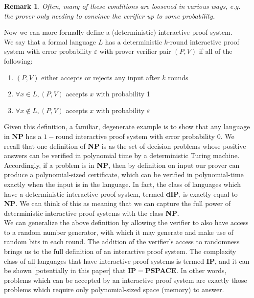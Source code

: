 \documentclass[12pt]{article}
\newtheorem*{rmk}{Remark}
\begin{document}
	\begin{rmk} Often, many of these conditions are loosened in various ways, e.g. the prover only needing to convince the verifier up to some probability.\end{rmk}
	
	Now we can more formally define a (deterministic) interactive proof system.\\
	
	We say that a formal language $L$ has a  deterministic $k$-round interactive proof system with error probability $\varepsilon$ with prover verifier pair $(P,V)$ if all of the following:
	\begin{enumerate}
		\item $(P,V)$ either accepts or rejects any input after $k$ rounds
		\item $\forall x\in L, (P,V)$ accepts $x$ with probability 1
		\item $\forall x\notin L, (P,V)$ accepts $x$ with probability $\varepsilon$ 
	\end{enumerate}
	
	Given this definition, a familiar, degenerate example is to show that any language in \textbf{NP} has a $1-$round interactive proof system with error probability $0$. We recall that one definition of \textbf{NP} is as the set of decision problems whose positive answers can be verified in polynomial time by a deterministic Turing machine. Accordingly, if a problem is in \textbf{NP}, then by definition on input our prover can produce a polynomial-sized certificate, which can be verified in polynomial-time exactly when the input is in the language. In fact, the class of languages which have a deterministic interactive proof system, termed \textbf{dIP}, is exactly equal to \textbf{NP}. We can think of this as meaning that we can capture the full power of deterministic interactive proof systems with the class \textbf{NP}.\\
	
	We can generalize the above definition by allowing the verifier to also have access to a random number generator, with which it may generate and make use of random bits in each round. The addition of the verifier's access to randomness brings us to the full definition of an interactive proof system. The complexity class of all languages that have interactive proof systems is termed \textbf{IP}, and it can be shown [potentially in this paper] that \textbf{IP}$=$\textbf{PSPACE}. In other words, problems which can be accepted by an interactive proof system are exactly those problems which require only polynomial-sized space (memory) to answer. 
\end{document}
